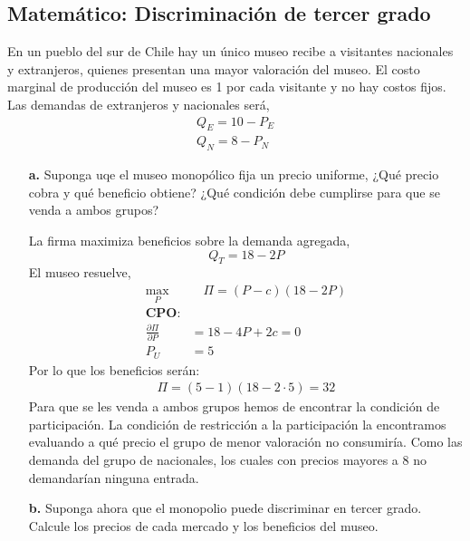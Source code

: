 \subsection{Matemático: Discriminación de tercer grado}



En un pueblo del sur de Chile hay un único museo recibe a visitantes nacionales y extranjeros, quienes presentan una mayor valoración del museo. El costo marginal de producción del museo es 1 por cada visitante y no hay costos fijos. Las demandas de extranjeros y nacionales será,
\begin{align*}
    Q_E = 10-P_E \\
    Q_N = 8 - P_N
\end{align*}
\begin{itemize}
    \item[\textbf{a.}] Suponga uqe el museo monopólico fija un precio uniforme, ¿Qué precio cobra y qué beneficio obtiene? ¿Qué condición debe cumplirse para que se venda a ambos grupos?
    \begin{solution}
        La firma maximiza beneficios sobre la demanda agregada,
        \begin{equation*}
            Q_T = 18-2P
        \end{equation*}
        El museo resuelve,
        \begin{align*}
            \max_{P} & \quad \Pi = (P-c)(18-2P) \\
            \textbf{CPO:} & \\
            \frac{\partial \Pi}{\partial P} & = 18-4P + 2c = 0 \\
            P_U &= 5
        \end{align*}
        Por lo que los beneficios serán:
        \begin{align*}
            \Pi = (5-1)(18-2\cdot 5) = 32
        \end{align*}
        Para que se les venda a ambos grupos hemos de encontrar la condición de participación. La condición de restricción a la participación la encontramos evaluando a qué precio el grupo de menor valoración no consumiría. Como las demanda del grupo de nacionales, los cuales con precios mayores a 8 no demandarían ninguna entrada. 
    \end{solution}
    \item[\textbf{b.}] Suponga ahora que el monopolio puede discriminar en tercer grado. Calcule los precios de cada mercado y los beneficios del museo.
    \begin{solution}

\end{solution}
\end{itemize}
